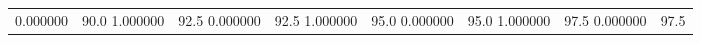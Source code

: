 \begin{table}
\begin{tabular}{llrrrrrr}
0.000000 & 90.0%
1.000000 & 92.5%
0.000000 & 92.5%
1.000000 & 95.0%
0.000000 & 95.0%
1.000000 & 97.5%
0.000000 & 97.5%
\end{tabular}
\end{table}
